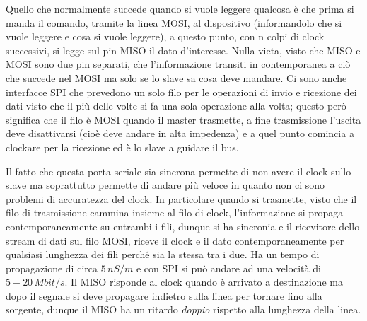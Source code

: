 \documentclass[12pt, a4paper]{report}
\begin{document}
Quello che normalmente succede quando si vuole leggere qualcosa è che prima si manda il comando, tramite la linea MOSI, al dispositivo (informandolo che si vuole leggere e cosa si vuole leggere), a questo punto, con n colpi di clock successivi, si legge sul pin MISO il dato d'interesse. Nulla vieta, visto che MISO e MOSI sono due pin separati, che l'informazione transiti in contemporanea a ciò che succede nel MOSI ma solo se lo slave sa cosa deve mandare. Ci sono anche interfacce SPI che prevedono un solo filo per le operazioni di invio e ricezione dei dati visto che il più delle volte si fa una sola operazione alla volta; questo però significa che il filo è MOSI quando il master trasmette, a fine trasmissione l'uscita deve disattivarsi (cioè deve andare in alta impedenza) e a quel punto comincia a clockare per la ricezione ed è lo slave a guidare il bus.

Il fatto che questa porta seriale sia sincrona permette di non avere il clock sullo slave ma soprattutto permette di andare più veloce in quanto non ci sono problemi di accuratezza del clock. In particolare quando si trasmette, visto che il filo di trasmissione cammina insieme al filo di clock, l'informazione si propaga contemporaneamente su entrambi i fili, dunque si ha sincronia e il ricevitore dello stream di dati sul filo MOSI, riceve il clock e il dato contemporaneamente per qualsiasi lunghezza dei fili perché sia la stessa tra i due. Ha un tempo di propagazione di circa $5\,nS/m$ e con SPI si può andare ad una velocità di $5 - 20\,\textit{Mbit/s}$. Il MISO risponde al clock quando è arrivato a destinazione ma dopo il segnale si deve propagare indietro sulla linea per tornare fino alla sorgente, dunque il MISO ha un ritardo \textit{doppio} rispetto alla lunghezza della linea.
\end{document}
